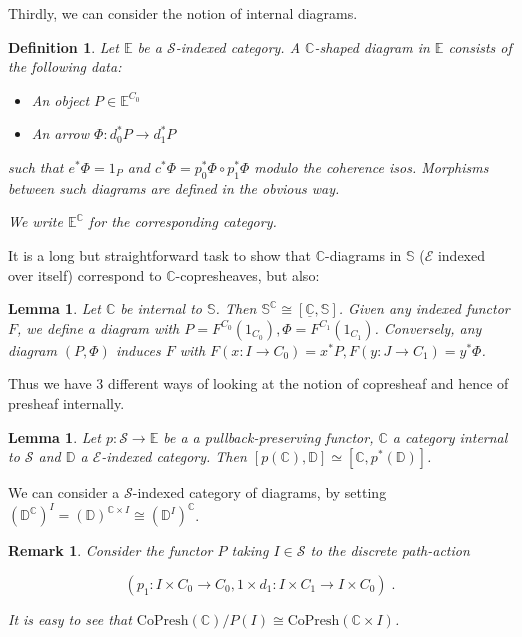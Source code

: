\documentclass[10pt, oneside]{article}
\newtheorem{definition}[theorem]{Definition}
\newtheorem{remark}[theorem]{Remark}
\newtheorem{lemma}[theorem]{Lemma}
\begin{document}
Thirdly, we can consider the notion of internal diagrams.

\begin{definition}
    Let $\mathbb{E}$ be a $\mathcal{S}$-indexed category. A $\mathbb{C}$-shaped diagram in $\mathbb{E}$ consists of the following data:

    \begin{itemize}
        \item An object $P \in \mathbb{E}^{C_0}$
        \item An arrow $\Phi: d_0^\ast P \to d_1^\ast P$
    \end{itemize}

    such that $e^\ast \Phi = 1_P$ and $c^\ast \Phi = p_0^\ast \Phi \circ p_1^\ast \Phi$ modulo the coherence isos. Morphisms between such diagrams are defined in the obvious way.

    We write $\mathbb{E}^\mathbb{C}$ for the corresponding category.
\end{definition}

It is a long but straightforward task to show that $\mathbb{C}$-diagrams in $\mathbb{S}$ ($\mathcal{E}$ indexed over itself) correspond to $\mathbb{C}$-copresheaves, but also:

\begin{lemma}
    Let $\mathbb{C}$ be internal to $\mathbb{S}$. Then $\mathbb{S}^\mathbb{C} \cong [\underline{\mathbb{C}}, \mathbb{S}]$. Given any indexed functor $F$, we define a diagram with $P = F^{C_0}(1_{C_0}), \Phi = F^{C_1}(1_{C_1})$. Conversely, any diagram $(P, \Phi)$ induces $F$ with $F(x: I \to C_0) = x^\ast P, F(y: J \to C_1) = y^\ast \Phi$.
\end{lemma}

Thus we have 3 different ways of looking at the notion of copresheaf and hence of presheaf internally.

\begin{lemma}
    Let $p: \mathcal{S} \to \mathbb{E}$ be a a pullback-preserving functor, $\mathbb{C}$ a category internal to $\mathcal{S}$ and $\mathbb{D}$ a $\mathcal{E}$-indexed category. Then $[p(\mathbb{C}), \mathbb{D}] \simeq [\mathbb{C}, p^\ast(\mathbb{D})]$.
\end{lemma}

We can consider a $\mathcal{S}$-indexed category of diagrams, by setting $(\mathbb{D}^\mathbb{C})^I = (\mathbb{D})^{\mathbb{C} \times I} \cong (\mathbb{D}^I)^\mathbb{C}$.

\begin{remark}
    Consider the functor $P$ taking $I \in \mathcal{S}$ to the discrete path-action
    
    $$(p_1: I \times C_0 \to C_0, 1 \times d_1: I \times C_1 \to I \times C_0) \; .$$
    
    It is easy to see that $\mathrm{CoPresh}{(\mathbb{C})}/P(I) \cong \mathrm{CoPresh}{(\mathbb{C} \times I)}$. 
\end{remark}
\end{document}
